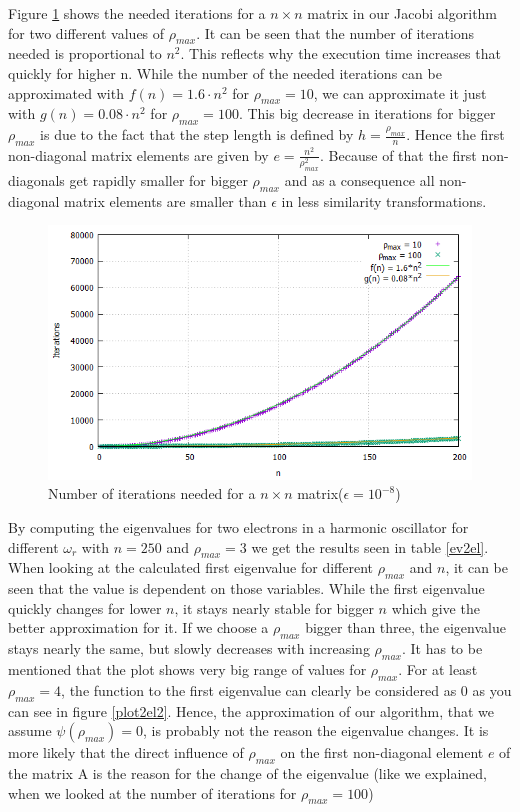 \documentclass[10pt,a4paper]{article}
\begin{document}
Figure \ref{plotiterations} shows the needed iterations for a $n\times n$ matrix in our Jacobi algorithm for two different values of $\rho_{max}$. It can be seen that the number of iterations needed is proportional to $n^{2}$. This reflects why the execution time increases that quickly for higher n. While the number of the needed iterations can be approximated with $f(n) = 1.6 \cdot n^2$ for  $\rho_{max} = 10$, we can approximate it just with $g(n) = 0.08 \cdot n^2$ for  $\rho_{max} = 100$. This big decrease in iterations for bigger $\rho_{max}$ is due to the fact that the step length is defined by $h = \frac{\rho_{max}}{n}$. Hence the first non-diagonal matrix elements are given by $e = \frac{n^2}{\rho_{max}^2}$. Because of that the first non-diagonals get rapidly smaller for bigger $\rho_{max}$ and as a consequence all non-diagonal matrix elements are smaller than $\epsilon$ in less similarity transformations. 

\begin{figure}[h]
	\includegraphics[scale = 0.45]{iterations_comparison_notitle.png}
	\centering
	\caption{Number of iterations needed for a $n\times n$ matrix($\epsilon = 10^{-8}$)}
	\label{plotiterations}
\end{figure}

By computing the eigenvalues for two electrons in a harmonic oscillator for different $\omega_{r}$ with $n = 250$ and $\rho_{max} = 3$ we get the results seen in table \ref{ev2el}. When looking at the calculated first eigenvalue for different $\rho_{max}$ and $n$, it can be seen that the value is dependent on those variables. While the first eigenvalue quickly changes for lower $n$, it stays nearly stable for bigger $n$ which give the better approximation for it. If we choose a $\rho_{max}$ bigger than three, the eigenvalue stays nearly the same, but slowly decreases with increasing $\rho_{max}$. It has to be mentioned that the plot shows very big range of values for $\rho_{max}$. For at least $\rho_{max} = 4$, the function to the first eigenvalue can clearly be considered as $0$ as you can see in figure \ref{plot2el2}. Hence, the approximation of our algorithm, that we assume $\psi(\rho_{max}) = 0$, is probably not the reason the eigenvalue changes. It is more likely that the direct influence of $\rho_{max}$ on the first non-diagonal element $e$ of the matrix A is the reason for the change of the eigenvalue (like we explained, when we looked at the number of iterations for $\rho_{max} = 100$)
\end{document}
